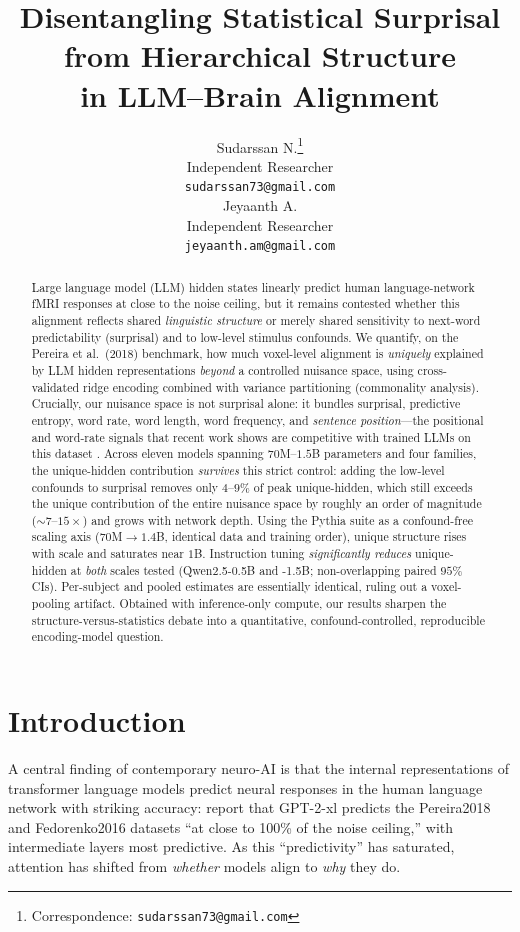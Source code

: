 \documentclass{article}
\title{Disentangling Statistical Surprisal from Hierarchical Structure\\
in LLM--Brain Alignment}
\author{%
  Sudarssan N.\thanks{Correspondence: \texttt{sudarssan73@gmail.com}} \\
  Independent Researcher \\
  \texttt{sudarssan73@gmail.com} \\
  \And
  Jeyaanth A. \\
  Independent Researcher \\
  \texttt{jeyaanth.am@gmail.com} \\
}
\begin{document}
\maketitle

\begin{abstract}
Large language model (LLM) hidden states linearly predict human language-network fMRI
responses at close to the noise ceiling, but it remains contested whether this alignment
reflects shared \emph{linguistic structure} or merely shared sensitivity to next-word
predictability (surprisal) and to low-level stimulus confounds. We quantify, on the Pereira
et al.\ (2018) benchmark, how much voxel-level alignment is \emph{uniquely} explained by LLM
hidden representations \emph{beyond} a controlled nuisance space, using cross-validated ridge
encoding combined with variance partitioning (commonality analysis). Crucially, our nuisance
space is not surprisal alone: it bundles surprisal, predictive entropy, word rate, word
length, word frequency, and \emph{sentence position}---the positional and word-rate signals
that recent work shows are competitive with trained LLMs on this dataset
\citep{feghhi2024}. Across eleven models spanning $70$M--$1.5$B parameters and four families,
the unique-hidden contribution \emph{survives} this strict control: adding the low-level
confounds to surprisal removes only $4$--$9\%$ of peak unique-hidden, which still exceeds the
unique contribution of the entire nuisance space by roughly an order of magnitude
($\sim$$7$--$15\times$) and grows with network depth. Using the Pythia suite as a confound-free
scaling axis ($70$M$\rightarrow$$1.4$B, identical data and training order), unique structure
rises with scale and saturates near $1$B. Instruction tuning \emph{significantly reduces}
unique-hidden at \emph{both} scales tested (Qwen2.5-0.5B and -1.5B; non-overlapping paired
$95\%$ CIs). Per-subject and pooled estimates are essentially identical, ruling out a
voxel-pooling artifact. Obtained with inference-only compute, our results sharpen the
structure-versus-statistics debate into a quantitative, confound-controlled, reproducible
encoding-model question.
\end{abstract}

\section{Introduction}
\label{sec:intro}

A central finding of contemporary neuro-AI is that the internal representations of transformer
language models predict neural responses in the human language network with striking accuracy:
\citet{schrimpf2021} report that GPT-2-xl predicts the Pereira2018 and Fedorenko2016 datasets
``at close to 100\% of the noise ceiling,'' with intermediate layers most predictive. As this
``predictivity'' has saturated, attention has shifted from \emph{whether} models align to
\emph{why} they do.
\end{document}
